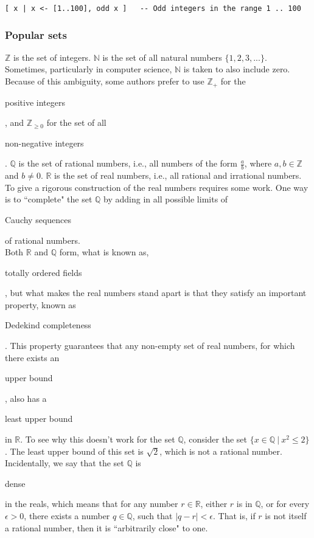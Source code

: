 \documentclass[11pt]{article}
\theoremstyle{plain}
\theoremstyle{definition}
\begin{document}
\begin{verbatim}
[ x | x <- [1..100], odd x ]   -- Odd integers in the range 1 .. 100
\end{verbatim}

\subsubsection*{Popular sets}

$ \mathbb{Z} $ is the set of integers. 
$ \mathbb{N} $ is the set of all natural numbers $ \{ 1, 2, 3, ... \} $. Sometimes, particularly in computer science, $ \mathbb{N} $ is taken to also include zero. Because of this ambiguity, some authors prefer to use $ \mathbb{Z}_+ $ for the \begin{em}positive integers\end{em}, and $ \mathbb{Z}_{\ge 0} $ for the set of all \begin{em}non-negative integers\end{em}.
$ \mathbb{Q} $ is the set of rational numbers, i.e., all numbers of the form $ \frac{a}{b} $, where $ a, b \in \mathbb{Z} $ and $ b \neq 0 $.
$ \mathbb{R} $ is the set of real numbers, i.e., all rational and irrational numbers. 
To give a rigorous construction of the real numbers requires some work. One way is to ``complete" the set $ \mathbb{Q} $ by adding in all possible limits of \begin{em}Cauchy sequences\end{em} of rational numbers. \\

\noindent Both $ \mathbb{R} $ and $ \mathbb{Q} $ form, what is known as, \begin{em}totally ordered fields\end{em}, but what makes the real numbers stand apart is that they satisfy an important property, known as \begin{em}Dedekind completeness\end{em}.
This property guarantees that any non-empty set of real numbers, for which there exists an \begin{em}upper bound\end{em}, also has a \begin{em}least upper bound\end{em} in $ \mathbb{R} $.
To see why this doesn't work for the set $ \mathbb{Q} $, consider the set $ \{ x \in \mathbb{Q} \ | \ x^2 \le 2 \} $. The least upper bound of this set is $ \sqrt{2} $, which is not a rational number.
Incidentally, we say that the set $ \mathbb{Q} $ is \begin{em}dense\end{em} in the reals, which means that for any number $ r \in \mathbb{R} $, either $ r $ is in $ \mathbb{Q} $, or for every $ \epsilon > 0$, there exists a number $ q \in \mathbb{Q} $, such that $ | q - r | < \epsilon $. That is, if $ r $ is not itself a rational number, then it is ``arbitrarily close" to one.
\end{document}
